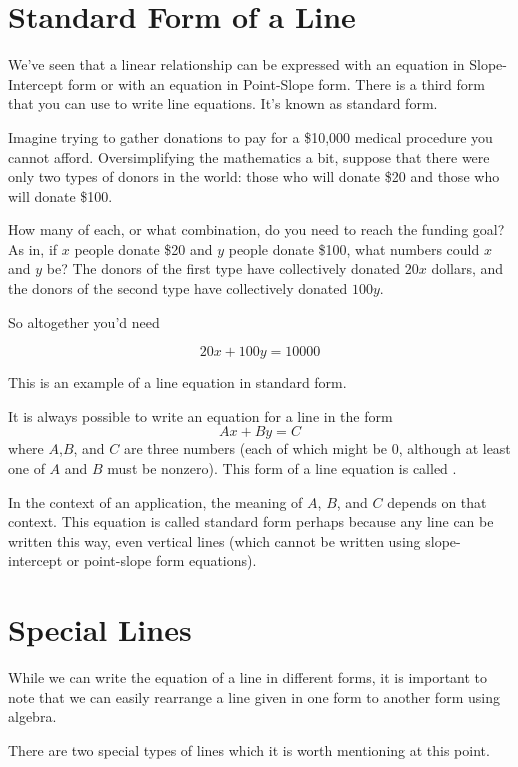 \documentclass[nooutcomes]{ximera}
\begin{document}
\section{Standard Form of a Line}

We've seen that a linear relationship can be expressed with an equation in Slope-Intercept form or with an equation in Point-Slope form. There is a third form that you can use to write line equations. It's known as standard form.

Imagine trying to gather donations to pay for a \$10,000 medical procedure you cannot afford. Oversimplifying the mathematics a bit, suppose that there were only two types of donors in the world: those who will donate \$20 and those who will donate \$100.

How many of each, or what combination, do you need to reach the funding goal? As in, if $x$ people donate \$20 and $y$ people donate \$100, what numbers could $x$ and $y$ be? The donors of the first type have collectively donated $20x$ dollars, and the donors of the second type have collectively donated $100y$.  

So altogether you'd need

$$20x+100y=10000$$

This is an example of a line equation in standard form.


\begin{definition}
 It is always possible to write an equation for a line in the form
$$Ax+By=C$$
where $A$,$B$, and $C$ are three numbers (each of which might be 0, although at least one of $A$ and $B$ must be nonzero). This form of a line equation is called . 
\end{definition}


In the context of an application, the meaning of $A$, $B$,  and $C$ depends on that context. This equation is called standard form perhaps because any line can be written this way, even vertical lines (which cannot be written using slope-intercept or point-slope form equations).


\section{Special Lines}
While we can write the equation of a line in different forms, it is important to note that we can easily rearrange a line given in one form to another form using algebra.

There are two special types of lines which it is worth mentioning at this point.   
\end{document}
